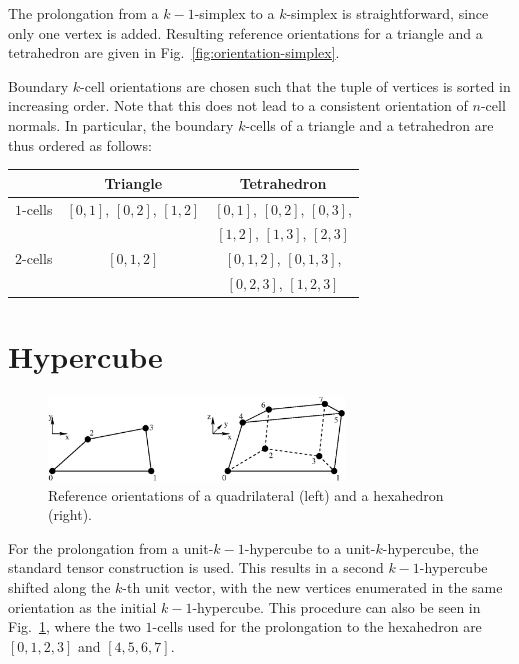 The prolongation from a $k-1$-simplex to a $k$-simplex is straightforward, since only one vertex is added.
Resulting reference orientations for a triangle and a tetrahedron are given in Fig.~\ref{fig:orientation-simplex}.

Boundary $k$-cell orientations are chosen such that the tuple of vertices is sorted in increasing order.
Note that this does not lead to a consistent orientation of $n$-cell normals. In particular,
the boundary $k$-cells of a triangle and a tetrahedron are thus ordered as follows:
\begin{center}
 \begin{tabular}{|l|c|c|}
  \hline
              & Triangle                  & Tetrahedron   \\
  \hline
   $1$-cells  & $[0,1]$, $[0,2]$, $[1,2]$ & $[0, 1]$, $[0, 2]$, $[0,3]$, \\
              &                           & $[1, 2]$, $[1, 3]$, $[2,3]$ \\
  \hline
   $2$-cells  & $[0,1,2]$                 & $[0,1,2]$, $[0,1,3]$, \\
              &                           & $[0,2,3]$, $[1,2,3]$ \\
  \hline
 \end{tabular}

\end{center}


\section{Hypercube}
\begin{figure}[tb]
\centering
 \includegraphics[width=0.7\textwidth]{figures/orientation-hypercube.eps}
 \caption{Reference orientations of a quadrilateral (left) and a hexahedron (right).}
 \label{fig:orientation-hypercube}
\end{figure}

For the prolongation from a unit-$k-1$-hypercube to a unit-$k$-hypercube, the standard tensor
construction is used. This results in a second $k-1$-hypercube shifted along the $k$-th unit vector,
with the new vertices enumerated in the same orientation as the initial $k-1$-hypercube.
This procedure can also be seen in Fig.~\ref{fig:orientation-hypercube}, where 
the two $1$-cells used for the prolongation to the hexahedron are $[0,1,2,3]$ and $[4,5,6,7]$.

